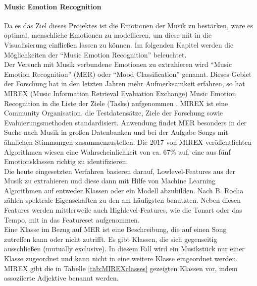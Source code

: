 \documentclass[11pt,a4paper]{article}
\begin{document}
\paragraph{Music Emotion Recognition}
Da es das Ziel dieses Projektes ist die Emotionen der Musik zu bestärken, wäre es optimal, menschliche Emotionen zu modellieren, um diese mit in die Visualisierung einfließen lassen zu können. Im folgenden Kapitel werden die Möglichkeiten der ``Music Emotion Recognition'' beleuchtet.\\
Der Versuch mit Musik verbundene Emotionen zu extrahieren wird ``Music Emotion Recognition'' (MER) oder ``Mood Classification'' genannt. Dieses Gebiet der Forschung hat in den letzten Jahren mehr Aufmerksamkeit erfahren, so hat MIREX (Music Information Retrieval Evaluation Exchange) Music Emotion Recognition in die Liste der Ziele (Tasks) aufgenommen \cite{dadf933477b66ec1591840023fc37ac83b3e10d5aa4fd440639abca907d805ba}. MIREX ist eine Community Organisation, die Testdatensätze, Ziele der Forschung sowie Evaluierungsmethoden standardisiert.
Anwendung findet MER besonders in der Suche nach Musik in großen Datenbanken und bei der Aufgabe Songs mit ähnlichen Stimmungen zusammenzustellen. Die 2017 von MIREX veröffentlichten Algorithmen wiesen eine Wahrscheinlichkeit von ca. 67\% auf, eine aus fünf Emotionsklassen richtig zu identifizieren\cite{mirex_results_2017}.\\
Die heute eingesetzten Verfahren basieren darauf, Lowlevel-Features aus der Musik zu extrahieren und diese dann mit Hilfe von Machine Learning Algorithmen auf entweder Klassen oder ein Modell abzubilden. Nach B. Rocha \cite[S. 2]{43334da08db3748e0a566e71fbb76d92cf6f15f35575908aa975b0b2baddab5b} zählen spektrale Eigenschaften zu den am häufigsten benutzten. Neben diesen Features werden mittlerweile auch Highlevel-Features, wie die Tonart oder das Tempo, mit in das Featureset aufgenommen.\\
Eine Klasse im Bezug auf MER ist eine Beschreibung, die auf einen Song zutreffen kann oder nicht zutrifft. Es gibt Klassen, die sich gegenseitig ausschließen (mutually exclusive). In diesem Fall wird ein Musikstück nur einer Klasse zugeordnet und kann nicht in eine weitere Klasse eingeordnet werden.\\
MIREX gibt die in Tabelle \ref{tab:MIREXclasses} gezeigten Klassen vor, indem assoziierte Adjektive benannt werden.
\end{document}

